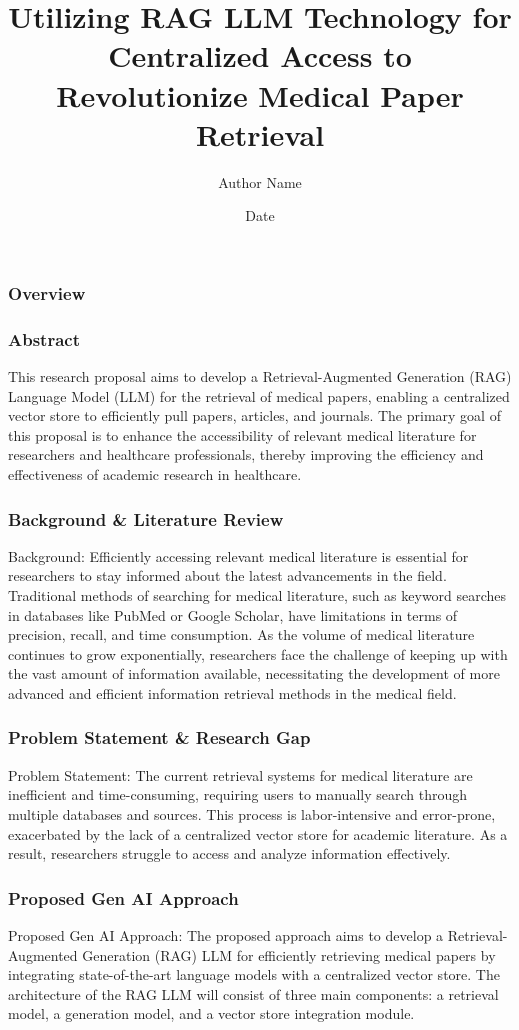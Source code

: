 \documentclass{beamer}
\title{Utilizing RAG LLM Technology for Centralized Access to Revolutionize Medical Paper Retrieval}
\author{Author Name}
\date{Date}
\begin{document}
\frame{\titlepage}

\begin{frame}
\frametitle{Overview}
\tableofcontents
\end{frame}

\begin{frame}
\frametitle{Abstract}
This research proposal aims to develop a Retrieval-Augmented Generation (RAG) Language Model (LLM) for the retrieval of medical papers, enabling a centralized vector store to efficiently pull papers, articles, and journals. The primary goal of this proposal is to enhance the accessibility of relevant medical literature for researchers and healthcare professionals, thereby improving the efficiency and effectiveness of academic research in healthcare.
\end{frame}

\begin{frame}
\frametitle{Background \& Literature Review}
Background:
Efficiently accessing relevant medical literature is essential for researchers to stay informed about the latest advancements in the field. Traditional methods of searching for medical literature, such as keyword searches in databases like PubMed or Google Scholar, have limitations in terms of precision, recall, and time consumption. As the volume of medical literature continues to grow exponentially, researchers face the challenge of keeping up with the vast amount of information available, necessitating the development of more advanced and efficient information retrieval methods in the medical field.
\end{frame}

\begin{frame}
\frametitle{Problem Statement \& Research Gap}
Problem Statement:
The current retrieval systems for medical literature are inefficient and time-consuming, requiring users to manually search through multiple databases and sources. This process is labor-intensive and error-prone, exacerbated by the lack of a centralized vector store for academic literature. As a result, researchers struggle to access and analyze information effectively.
\end{frame}

\begin{frame}
\frametitle{Proposed Gen AI Approach}
Proposed Gen AI Approach:
The proposed approach aims to develop a Retrieval-Augmented Generation (RAG) LLM for efficiently retrieving medical papers by integrating state-of-the-art language models with a centralized vector store. The architecture of the RAG LLM will consist of three main components: a retrieval model, a generation model, and a vector store integration module.
\end{frame}
\end{document}
